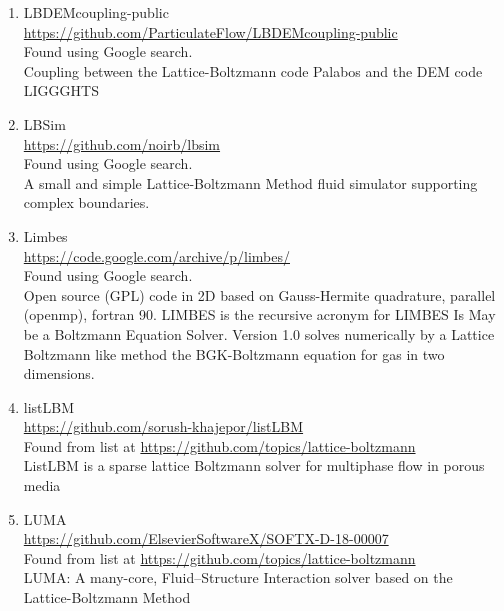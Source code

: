 \documentclass{article}
\begin{document}
\begin{enumerate}
	\item LBDEMcoupling-public
\\
	\href{https://github.com/ParticulateFlow/LBDEMcoupling-public}{https://github.com/ParticulateFlow/LBDEMcoupling-public}
\\
	Found using Google search.\\
	Coupling between the Lattice-Boltzmann code Palabos and the DEM code LIGGGHTS
	
	\item LBSim
\\
	\href{https://github.com/noirb/lbsim}{https://github.com/noirb/lbsim}
\\
	Found using Google search.\\
	A small and simple Lattice-Boltzmann Method fluid simulator supporting complex boundaries.
	
	\item Limbes
\\
	\href{https://code.google.com/archive/p/limbes/}{https://code.google.com/archive/p/limbes/} \\
	Found using Google search.\\
	Open source (GPL) code in 2D based on Gauss-Hermite quadrature, parallel (openmp), fortran 90. LIMBES is the recursive acronym for LIMBES Is May be a Boltzmann Equation Solver. Version 1.0 solves numerically by a Lattice Boltzmann like method the BGK-Boltzmann equation for gas in two dimensions.
	
	\item listLBM
\\
	\href{https://github.com/sorush-khajepor/listLBM}{https://github.com/sorush-khajepor/listLBM} \\
		Found from list at \href{https://github.com/topics/lattice-boltzmann}{https://github.com/topics/lattice-boltzmann}\\
	ListLBM is a sparse lattice Boltzmann solver for multiphase flow in porous media
	
	\item LUMA
\\
	\href{https://github.com/ElsevierSoftwareX/SOFTX-D-18-00007}{https://github.com/ElsevierSoftwareX/SOFTX-D-18-00007}\\
		Found from list at \href{https://github.com/topics/lattice-boltzmann}{https://github.com/topics/lattice-boltzmann}\\
	LUMA: A many-core, Fluid–Structure Interaction solver based on the Lattice-Boltzmann Method
	

\end{enumerate}
\end{document}
